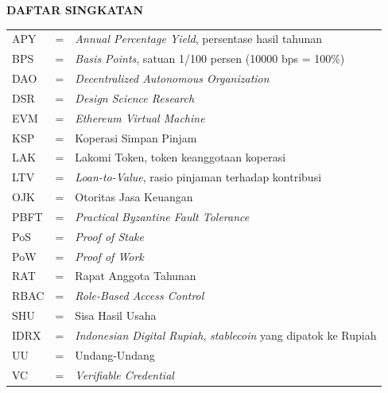 \begin{center}
	\textbf{DAFTAR SINGKATAN}
\end{center}

\begin{tabular}{llp{3.5in}}
	APY & \hspace{1.5cm} = & \textit{Annual Percentage Yield}, persentase hasil tahunan \\
	BPS & \hspace{1.5cm} = & \textit{Basis Points}, satuan 1/100 persen (10000 bps = 100\%) \\
	DAO & \hspace{1.5cm} = & \textit{Decentralized Autonomous Organization} \\
	DSR & \hspace{1.5cm} = & \textit{Design Science Research} \\
	EVM & \hspace{1.5cm} = & \textit{Ethereum Virtual Machine} \\
	KSP & \hspace{1.5cm} = & Koperasi Simpan Pinjam \\
	LAK & \hspace{1.5cm} = & Lakomi Token, token keanggotaan koperasi \\
	LTV & \hspace{1.5cm} = & \textit{Loan-to-Value}, rasio pinjaman terhadap kontribusi \\
	OJK & \hspace{1.5cm} = & Otoritas Jasa Keuangan \\
	PBFT & \hspace{1.5cm} = & \textit{Practical Byzantine Fault Tolerance} \\
	PoS & \hspace{1.5cm} = & \textit{Proof of Stake} \\
	PoW & \hspace{1.5cm} = & \textit{Proof of Work} \\
	RAT & \hspace{1.5cm} = & Rapat Anggota Tahunan \\
	RBAC & \hspace{1.5cm} = & \textit{Role-Based Access Control} \\
	SHU & \hspace{1.5cm} = & Sisa Hasil Usaha \\
	IDRX & \hspace{1.5cm} = & \textit{Indonesian Digital Rupiah}, \textit{stablecoin} yang dipatok ke Rupiah \\
	UU & \hspace{1.5cm} = & Undang-Undang \\
	VC & \hspace{1.5cm} = & \textit{Verifiable Credential} \\
\end{tabular}
